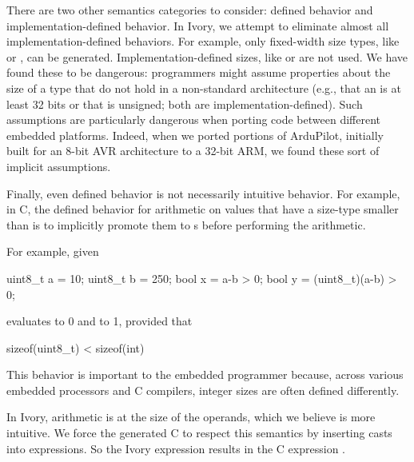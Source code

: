 There are two other semantics categories to consider: defined behavior and
implementation-defined behavior.  In Ivory, we attempt to eliminate almost all
implementation-defined behaviors.  For example, only fixed-width size types,
like  or , can be generated.  Implementation-defined
sizes, like  or  are not used.  We have found these to be
dangerous: programmers might assume properties about the size of a type that do not
hold in a non-standard architecture (e.g., that an  is at least 32 bits
or that  is unsigned; both are implementation-defined).  Such
assumptions are particularly dangerous when porting code between different
embedded platforms.  Indeed, when we ported portions of ArduPilot, initially built
for an 8-bit AVR architecture to a 32-bit ARM, we found these sort of implicit
assumptions.

Finally, even defined behavior is not necessarily intuitive behavior.  For
example, in C, the defined behavior for arithmetic on values that have a
size-type smaller than  is to implicitly promote them to s before
performing the arithmetic.

For example, given
\begin{code}
uint8\_t a = 10;
uint8\_t b = 250;
bool    x = a-b > 0;
bool    y = (uint8\_t)(a-b) > 0;
\end{code}
\noindent
{} evaluates to 0 and  to 1, provided that
\begin{code}
sizeof(uint8\_t) < sizeof(int)
\end{code}
\noindent
This behavior is important to the embedded programmer because, across various
embedded processors and C compilers, integer sizes are often defined
differently.

In Ivory, arithmetic is at the size of the operands, which we believe is more
intuitive.  We force the generated C to respect this semantics by inserting
casts into expressions.  So the Ivory expression  results in the C
expression .



